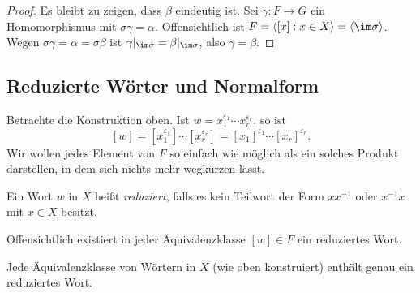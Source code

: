 \documentclass[11pt]{article}
\begin{document}
\begin{proof}
  Es bleibt zu zeigen, dass $\beta$ eindeutig ist. Sei $\gamma\colon F \to G$ ein Homomorphismus mit $\sigma\gamma = \alpha$. Offensichtlich ist $F = \langle [x] : x \in X \rangle = \langle \im\sigma \rangle$. Wegen $\sigma\gamma = \alpha = \sigma\beta$ ist $\gamma|_{\im\sigma} = \beta|_{\im\sigma}$, also $\gamma = \beta$.
\end{proof}


\subsection{Reduzierte Wörter und Normalform}

Betrachte die Konstruktion oben. Ist $w = x_1^{\varepsilon_1} \cdots x_r^{\varepsilon_r}$, so ist
\[ [w] = [x_1^{\varepsilon_1}] \cdots [x_r^{\varepsilon_r}] = [x_1]^{\varepsilon_1} \cdots [x_r]^{\varepsilon_r}. \]
Wir wollen jedes Element von $F$ so einfach wie möglich als ein solches Produkt darstellen, in dem sich nichts mehr \glqq wegkürzen\grqq{} lässt.

\begin{definition}\Theorem
  Ein Wort $w$ in $X$ heißt \emph{reduziert}, falls es kein Teilwort der Form $xx^{-1}$ oder $x^{-1}x$ mit $x \in X$ besitzt.
\end{definition}

Offensichtlich existiert in jeder Äquivalenzklasse $[w] \in F$ ein reduziertes Wort.

\begin{theorem}\Theorem
  Jede Äquivalenzklasse von Wörtern in $X$ (wie oben konstruiert) enthält genau ein reduziertes Wort.
\end{theorem}
\end{document}
